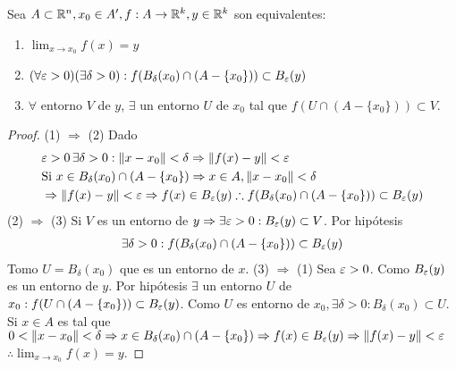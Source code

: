 \begin{prop}
  Sea \(A \subset \mathbb{R}^n, x_0 \in A^{\prime}, f: A \to \mathbb{R}^k, y \in \mathbb{R}^k\) son equivalentes:
  \begin{enumerate}
    \item \(\lim_{x \to x_0} f(x) = y\)
    \item \((\forall \varepsilon > 0)(\exists \delta > 0) : f(B_{\delta}(x_0) \cap (A - \{x_0\})) \subset B_{\varepsilon}(y)\)
    \item \(\forall \) entorno \(V\) de \(y\), \(\exists \) un entorno \(U\) de \(x_0\) tal que \(f(U \cap (A - \{x_0\})) \subset V\).
  \end{enumerate}

  \begin{proof}
    (1) \(\Rightarrow \) (2) Dado \begin{align*}
       & \varepsilon > 0 \, \exists \delta > 0 : \|x - x_0 \| < \delta \Rightarrow \|f(x) - y\| < \varepsilon                                              \\
       & \text{Si } x \in B_{\delta}(x_0) \cap (A - \{x_0\}) \Rightarrow x \in A, \|x - x_0\| < \delta                                   \\
       & \Rightarrow \|f(x) - y\| < \varepsilon \Rightarrow f(x) \in B_{\varepsilon}(y) \therefore f(B_{\delta}(x_0) \cap (A - \{x_0\})) \subset B_{\varepsilon}(y)
    \end{align*}
    (2) \(\Rightarrow \) (3) Si \(V\) es un entorno de \(y \Rightarrow \exists \varepsilon > 0 : B_{\varepsilon}(y) \subset V\). Por hipótesis \begin{align*}
      \exists \delta > 0 : f(B_{\delta}(x_0) \cap (A - \{x_0\})) \subset B_{\varepsilon}(y)
    \end{align*} Tomo \(U = B_{\delta}(x_0)\) que es un entorno de \(x\).
    (3) \(\Rightarrow \) (1) Sea \(\varepsilon > 0\). Como \(B_{\varepsilon}(y)\) es un entorno de \(y\). Por hipótesis \(\exists \) un entorno \(U\) de \(x_0 : f(U \cap (A - \{x_0\})) \subset B_{\varepsilon}(y)\). Como \(U\) es entorno de \(x_0, \exists \delta > 0 : B_{\delta}(x_0) \subset U\). \\
    Si \(x \in A\) es tal que \(0 < \|x - x_0\| < \delta \Rightarrow x \in B_{\delta}(x_0) \cap (A - \{x_0\}) \Rightarrow f(x) \in B_{\varepsilon}(y) \Rightarrow \|f(x) - y\| < \varepsilon \) \\
    \(\therefore \lim_{x \to x_0} f(x) = y\).
  \end{proof}
\end{prop}

